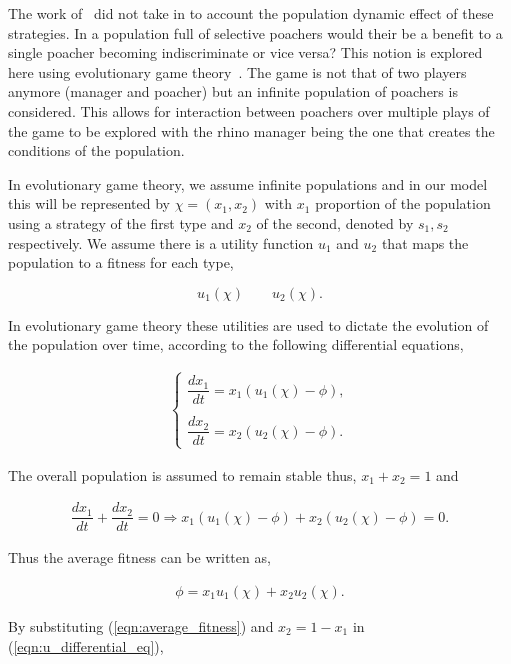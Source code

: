 \documentclass[10pt]{article}
\begin{document}
The work of~\cite{Lee} did not take in to account the population dynamic effect
of  these strategies. In a population full of selective poachers would their be 
a benefit to a single poacher becoming indiscriminate or vice versa? This notion 
is explored here using evolutionary game theory~\cite{Smith}. The 
game is not that of two players anymore (manager and poacher) but an infinite
population of poachers is considered. This allows for interaction between poachers
over multiple plays of the game to be explored with the rhino manager being the
one that creates the conditions of the population. 

In evolutionary game theory, we assume infinite populations and in our
model this will be represented by \(\chi=(x_1, x_2)\) with \(x_1\) proportion of the
population using a strategy of the first type and \(x_2\) of the second, denoted
by \(s_1, s_2\) respectively. We assume there is a utility function \(u_1\) and 
\(u_2\) that maps the population to a fitness for each type,

\[ u_1(\chi)  \qquad u_2(\chi).\] 

In evolutionary game theory these utilities are used to dictate the evolution of
the population over time, according to the following differential equations,

\begin{eqnarray}
	\label{eqn:u_differential_eq}
	\left\{
	\begin{array}{cl}
	\dfrac{dx_1}{dt}=x_1(u_1(\chi)-\phi),
	\\
	\\
	\dfrac{dx_2}{dt}= x_2(u_2(\chi)-\phi).
	\end{array} \right.
\end{eqnarray}

The overall population is assumed to remain stable thus, \(x_1 + x_2 = 1 \)
and

\begin{eqnarray}
	\dfrac{dx_1}{dt}  + \dfrac{dx_2}{dt} = 0 \Rightarrow x_1(u_1(\chi) - \phi)
	 + x_2(u_2(\chi) - \phi)=0.
\end{eqnarray} 

Thus the average fitness can be written as,

\begin{eqnarray}
\label{eqn:average_fitness}
	\phi=x_1u_1(\chi) + x_2u_2(\chi).
\end{eqnarray}

By substituting (\ref{eqn:average_fitness}) and \(x_2= 1 - x_1\) in (\ref{eqn:u_differential_eq}),
\end{document}
